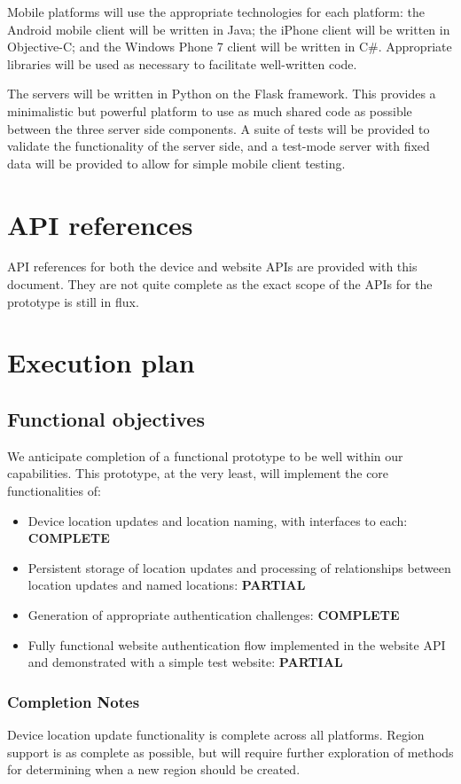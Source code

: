 \documentclass[11pt]{article} %
\begin{document}
Mobile platforms will use the appropriate technologies for each platform: the Android mobile client will be written in Java; the iPhone client will be written in Objective-C; and the Windows Phone 7 client will be written in C\#. Appropriate libraries will be used as necessary to facilitate well-written code.

The servers will be written in Python on the Flask framework. This provides a minimalistic but powerful platform to use as much shared code as possible between the three server side components. A suite of tests will be provided to validate the functionality of the server side, and a test-mode server with fixed data will be provided to allow for simple mobile client testing.

\section{API references}
API references for both the device and website APIs are provided with this document. They are not quite complete as the exact scope of the APIs for the prototype is still in flux.

\section{Execution plan}
\subsection{Functional objectives}
We anticipate completion of a functional prototype to be well within our capabilities. This prototype, at the very least, will implement the core functionalities of:

\begin{itemize}
\item Device location updates and location naming, with interfaces to each: \textbf{COMPLETE}
\item Persistent storage of location updates and processing of relationships between location updates and named locations: \textbf{PARTIAL}
\item Generation of appropriate authentication challenges: \textbf{COMPLETE}
\item Fully functional website authentication flow implemented in the website API and demonstrated with a simple test website: \textbf{PARTIAL}
\end{itemize}

\subsubsection{Completion Notes}
Device location update functionality is complete across all platforms. Region support is as complete as possible, but will require further exploration of methods for determining when a new region should be created.
\end{document}
